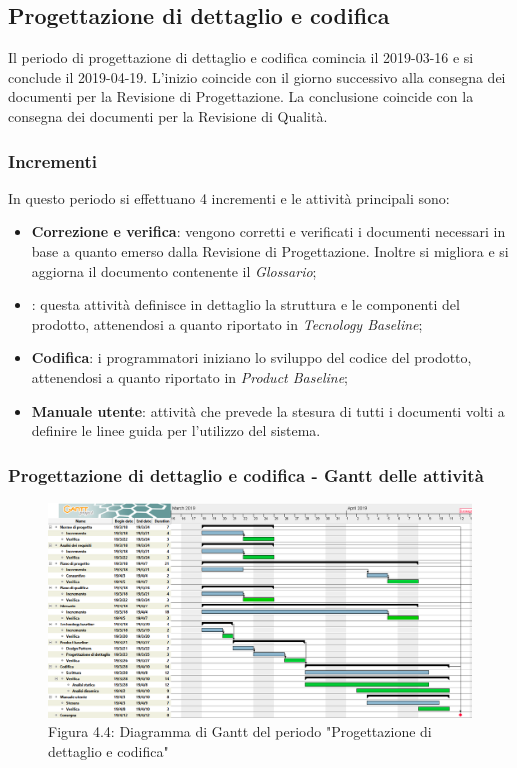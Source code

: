 \subsection{Progettazione di dettaglio e codifica}
Il periodo di progettazione di dettaglio e codifica comincia il 2019-03-16 e si conclude il 2019-04-19. L'inizio coincide con il giorno successivo alla consegna dei documenti per la Revisione di Progettazione. La conclusione coincide con la consegna dei documenti per la Revisione di Qualità. 
\subsubsection{Incrementi}
In questo periodo si effettuano 4 incrementi e le attività principali sono:
\begin{itemize}
\item{\textbf{Correzione e verifica}: vengono corretti e verificati i documenti necessari in base a quanto emerso dalla Revisione di Progettazione. Inoltre si migliora e si aggiorna il documento contenente il \emph{Glossario};} 
\item{\textbf{}: questa attività definisce in dettaglio la struttura e le componenti del prodotto, attenendosi a quanto riportato in \emph{Tecnology Baseline};} 
\item{\textbf{Codifica}: i programmatori iniziano lo sviluppo del codice del prodotto, attenendosi a quanto riportato in \emph{Product Baseline};}	
\item{\textbf{Manuale utente}: attività che prevede la stesura di tutti i documenti volti a definire le linee guida per l'utilizzo del sistema.}
\end{itemize}

\subsubsection{Progettazione di dettaglio e codifica - Gantt delle attività}

\begin{figure} [H]
	\centering
	\includegraphics[scale=0.35]{Res/Gantt/Codifica}
	\caption{Figura 4.4: Diagramma di Gantt del periodo "Progettazione di dettaglio e codifica"}\label{}
\end{figure}

\pagebreak
